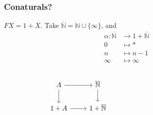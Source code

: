 \documentclass{beamer}
\begin{document}
\subsection{}
\begin{frame}
  \frametitle{Conaturals?}
  $FX = 1 + X$. Take $\overline{\mathbb{N}} = \mathbb{N} \cup \{\infty\}$, and
  \begin{align*}
    \alpha: \overline{\mathbb{N}} &\longrightarrow 1 + \overline{\mathbb{N}}\\
    0 &\longmapsto * \\
    n &\longmapsto n-1 \\
    \infty &\longmapsto \infty
  \end{align*}
      \begin{columns}
        \begin{column}{0.5\textwidth}
          \begin{equation*}
            \begin{tikzcd}[ampersand replacement=\&]
              A \rar \dar \& \overline{\mathbb{N}} \dar \\
              1 + A \rar \& 1 + \overline{\mathbb{N}}
            \end{tikzcd}
          \end{equation*}
        \end{column}
        \begin{column}{0.5\textwidth}
          \begin{center}
          \end{center}
        \end{column}
      \end{columns}
\end{frame}
\end{document}
